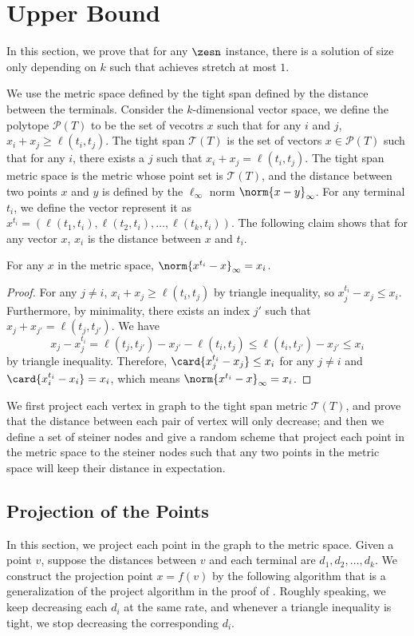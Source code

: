 \newcommand{\Poly}{\mathcal{P}}
\newcommand{\TS}{\mathcal{T}}

\section{Upper Bound}
In this section, we prove that for any $\zesn$ instance, there is a solution of size only depending on $k$ such that achieves stretch at most $1$.

We use the metric space defined by the tight span defined by the distance between the terminals. Consider the $k$-dimensional vector space, we define the polytope $\Poly(T)$ to be the set of vecotrs $x$ such that for any $i$ and $j$, $x_i+x_j \ge \ell(t_i,t_j)$. The tight span $\TS(T)$ is the set of vectors $x \in \Poly(T)$ such that for any $i$, there exists a $j$ such that $x_i+x_j = \ell(t_i,t_j)$. The tight span metric space is the metric whose point set is $\TS(T)$, and the distance between two points $x$ and $y$ is defined by the $\ell_{\infty}$ norm $\norm{x-y}_{\infty}$. For any terminal $t_i$, we define the vector represent it as $x^{t_i} = (\ell(t_1,t_i),\ell(t_2,t_i),\dots,\ell(t_k,t_i))$. The following claim shows that for any vector $x$, $x_i$ is the distance between $x$ and $t_i$.

\begin{claim} 
    For any $x$ in the metric space, $\norm{x^{t_i} - x}_{\infty} = x_i$.
\end{claim}

\begin{proof}
    For any $j \neq i$, $x_i+x_j\ge \ell(t_i,t_j)$ by triangle inequality, so $x^{t_i}_j-x_j \le x_i$. Furthermore, by minimality, there exists an index $j'$ such that $x_j+x_{j'} = \ell(t_j,t_{j'})$. We have 
    $$x_j -x^{t_i}_j = \ell(t_j,t_{j'}) - x_{j'} - \ell(t_i,t_j) \le \ell(t_i,t_{j'}) - x_{j'} \le x_i$$
    by triangle inequality. Therefore, $\card{x^{t_i}_j-x_j} \le x_i$ for any $j \neq i$ and $\card{x^{t_i}_i-x_i} = x_i$, which means $\norm{x^{t_i} - x}_{\infty} = x_i$.
\end{proof}

We first project each vertex in graph to the tight span metric $\TS(T)$, and prove that the distance between each pair of vertex will only decrease; and then we define a set of steiner nodes and give a random scheme that project each point in the metric space to the steiner nodes such that any two points in the metric space will keep their distance in expectation.

\subsection{Projection of the Points}
In this section, we project each point in the graph to the metric space. Given a point $v$, suppose the distances between $v$ and each terminal are $d_1,d_2,\dots,d_k$. We construct the projection point $x=f(v)$ by the following algorithm that is a generalization of the project algorithm in the proof of . Roughly speaking, we keep decreasing each $d_i$ at the same rate, and whenever a triangle inequality is tight, we stop decreasing the corresponding $d_i$.

